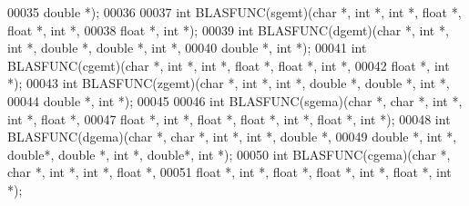 \begin{DoxyCode}
00035         \textcolor{keywordtype}{double} *);
00036 
00037 \textcolor{keywordtype}{int} BLASFUNC(sgemt)(\textcolor{keywordtype}{char} *, \textcolor{keywordtype}{int} *, \textcolor{keywordtype}{int} *, \textcolor{keywordtype}{float}  *, \textcolor{keywordtype}{float}  *, \textcolor{keywordtype}{int} *,
00038         \textcolor{keywordtype}{float}  *, \textcolor{keywordtype}{int} *);
00039 \textcolor{keywordtype}{int} BLASFUNC(dgemt)(\textcolor{keywordtype}{char} *, \textcolor{keywordtype}{int} *, \textcolor{keywordtype}{int} *, \textcolor{keywordtype}{double} *, \textcolor{keywordtype}{double} *, \textcolor{keywordtype}{int} *,
00040         \textcolor{keywordtype}{double} *, \textcolor{keywordtype}{int} *);
00041 \textcolor{keywordtype}{int} BLASFUNC(cgemt)(\textcolor{keywordtype}{char} *, \textcolor{keywordtype}{int} *, \textcolor{keywordtype}{int} *, \textcolor{keywordtype}{float}  *, \textcolor{keywordtype}{float}  *, \textcolor{keywordtype}{int} *,
00042         \textcolor{keywordtype}{float}  *, \textcolor{keywordtype}{int} *);
00043 \textcolor{keywordtype}{int} BLASFUNC(zgemt)(\textcolor{keywordtype}{char} *, \textcolor{keywordtype}{int} *, \textcolor{keywordtype}{int} *, \textcolor{keywordtype}{double} *, \textcolor{keywordtype}{double} *, \textcolor{keywordtype}{int} *,
00044         \textcolor{keywordtype}{double} *, \textcolor{keywordtype}{int} *);
00045 
00046 \textcolor{keywordtype}{int} BLASFUNC(sgema)(\textcolor{keywordtype}{char} *, \textcolor{keywordtype}{char} *, \textcolor{keywordtype}{int} *, \textcolor{keywordtype}{int} *, \textcolor{keywordtype}{float}  *,
00047         \textcolor{keywordtype}{float}  *, \textcolor{keywordtype}{int} *, \textcolor{keywordtype}{float} *, \textcolor{keywordtype}{float}  *, \textcolor{keywordtype}{int} *, \textcolor{keywordtype}{float} *, \textcolor{keywordtype}{int} *);
00048 \textcolor{keywordtype}{int} BLASFUNC(dgema)(\textcolor{keywordtype}{char} *, \textcolor{keywordtype}{char} *, \textcolor{keywordtype}{int} *, \textcolor{keywordtype}{int} *, \textcolor{keywordtype}{double} *,
00049         \textcolor{keywordtype}{double} *, \textcolor{keywordtype}{int} *, \textcolor{keywordtype}{double}*, \textcolor{keywordtype}{double} *, \textcolor{keywordtype}{int} *, \textcolor{keywordtype}{double}*, \textcolor{keywordtype}{int} *);
00050 \textcolor{keywordtype}{int} BLASFUNC(cgema)(\textcolor{keywordtype}{char} *, \textcolor{keywordtype}{char} *, \textcolor{keywordtype}{int} *, \textcolor{keywordtype}{int} *, \textcolor{keywordtype}{float}  *,
00051         \textcolor{keywordtype}{float}  *, \textcolor{keywordtype}{int} *, \textcolor{keywordtype}{float} *, \textcolor{keywordtype}{float}  *, \textcolor{keywordtype}{int} *, \textcolor{keywordtype}{float} *, \textcolor{keywordtype}{int} *);

\end{DoxyCode}
